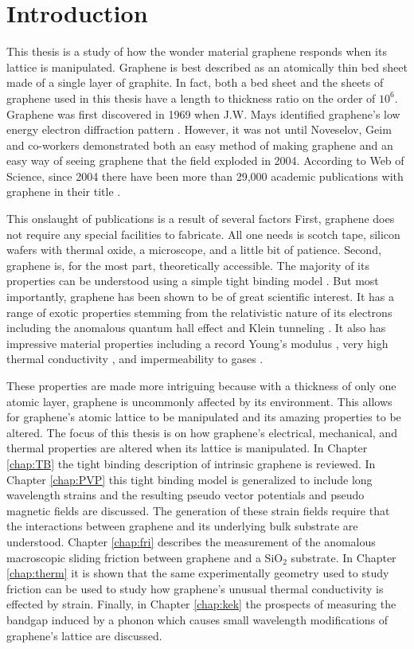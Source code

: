 \chapter{Introduction}

This thesis is a study of how the wonder material graphene responds when its lattice is manipulated.
Graphene is best described as an atomically thin bed sheet made of a single layer of graphite.
In fact, both a bed sheet and the sheets of graphene used in this thesis have a length to thickness ratio on the order of $10^6$.
Graphene was first discovered in 1969 when J.W. Mays identified graphene's low energy electron diffraction pattern \cite{May1969}. 
However, it was not until Noveselov, Geim and co-workers demonstrated both an easy method of making graphene and an easy way of seeing graphene \cite{Novoselov2004} that the field exploded in 2004.
According to Web of Science, since 2004 there have been more than 29,000 academic publications with graphene in their title \cite{WoS}.

This onslaught of publications is a result of several factors
First, graphene does not require any special facilities to fabricate.
All one needs is scotch tape, silicon wafers with thermal oxide, a microscope, and a little bit of patience.
Second, graphene is, for the most part, theoretically accessible.
The majority of its properties can be understood using a simple tight binding model \cite{CastroNeto2009}.
But most importantly, graphene has been shown to be of great scientific interest.
It has a range of exotic properties stemming from the relativistic nature of its electrons including the anomalous quantum hall effect \cite{Zhang2005} and Klein tunneling \cite{Young2009}.
It also has impressive material properties including a record Young’s modulus \cite{Lee2008}, very high thermal conductivity \cite{Faugeras2010}, and impermeability to gases \cite{Bunch2008}.

These properties are made more intriguing because with a thickness of only one atomic layer, graphene is uncommonly affected by its environment.
This allows for graphene's atomic lattice to be manipulated and its amazing properties to be altered.
The focus of this thesis is on how graphene's electrical, mechanical, and thermal properties are altered when its lattice is manipulated.
In Chapter \ref{chap:TB} the tight binding description of intrinsic graphene is reviewed.
In Chapter \ref{chap:PVP} this tight binding model is generalized to include long wavelength strains and the resulting pseudo vector potentials and pseudo magnetic fields are discussed.
The generation of these strain fields require that the interactions between graphene and its underlying bulk substrate are understood.
Chapter \ref{chap:fri} describes the measurement of the anomalous macroscopic sliding friction between graphene and a SiO$_2$ substrate.
In Chapter \ref{chap:therm} it is shown that the same experimentally geometry used to study friction can be used to study how graphene's unusual thermal conductivity is effected by strain.
Finally, in Chapter \ref{chap:kek} the prospects of measuring the bandgap induced by a phonon which causes small wavelength modifications of graphene's lattice are discussed.